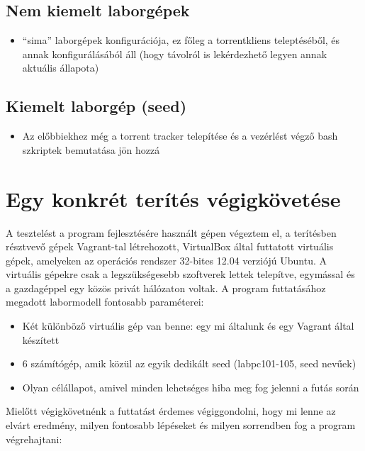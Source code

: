 %
\subsection{Nem kiemelt laborgépek}
%

\begin{itemize}
  \item ``sima'' laborgépek konfigurációja, ez főleg a torrentkliens teleptéséből, és annak konfigurálásából áll (hogy távolról is lekérdezhető legyen annak aktuális állapota)
\end{itemize}

%
\subsection{Kiemelt laborgép (seed)}
%

\begin{itemize}
  \item Az előbbiekhez még a torrent tracker telepítése és a vezérlést végző bash szkriptek bemutatása jön hozzá
\end{itemize}


\section{Egy konkrét terítés végigkövetése}

A tesztelést a program fejlesztésére használt gépen végeztem el, a terítésben résztvevő gépek Vagrant-tal létrehozott, VirtualBox által futtatott virtuális gépek, amelyeken az operációs rendszer 32-bites 12.04 verziójú Ubuntu\cite{ubuntu}. A virtuális gépekre csak a legszükségesebb szoftverek lettek telepítve, egymással és a gazdagéppel egy közös privát hálózaton voltak. A program futtatásához megadott labormodell fontosabb paraméterei:

\begin{itemize}
  \item Két különböző virtuális gép van benne: egy mi általunk és egy Vagrant által készített
  \item 6 számítógép, amik közül az egyik dedikált seed (labpc101-105, seed nevűek)
  \item Olyan célállapot, amivel minden lehetséges hiba meg fog jelenni a futás során
\end{itemize}

Mielőtt végigkövetnénk a futtatást érdemes végiggondolni, hogy mi lenne az elvárt eredmény, milyen fontosabb lépéseket és milyen sorrendben fog a program végrehajtani:

